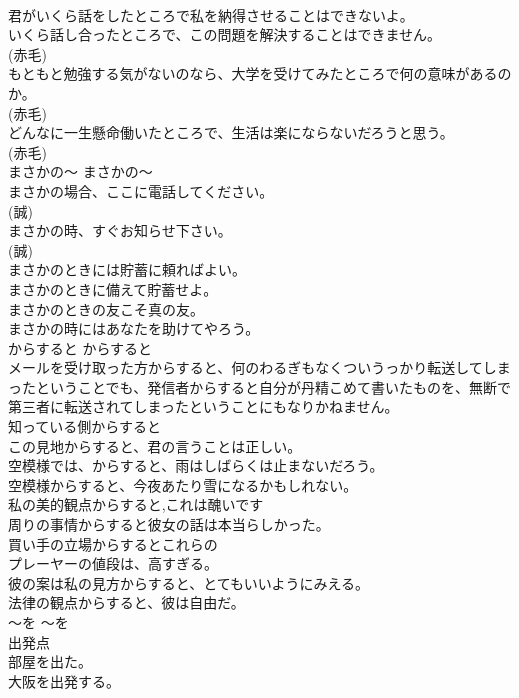 \documentclass[8pt]{extreport}
\begin{document}
\begin{CJK}{UTF8}{min}
\\	君がいくら話をしたところで私を納得させることはできないよ。  
\\	いくら話し合ったところで、この問題を解決することはできません。  
\\	(赤毛)
\\	もともと勉強する気がないのなら、大学を受けてみたところで何の意味があるのか。  
\\	(赤毛)
\\	どんなに一生懸命働いたところで、生活は楽にならないだろうと思う。  
\\	(赤毛)
\\	まさかの〜	まさかの〜	
\\	まさかの場合、ここに電話してください。  
\\	(誠)
\\	まさかの時、すぐお知らせ下さい。  
\\	(誠)
\\	まさかのときには貯蓄に頼ればよい。  
\\	まさかのときに備えて貯蓄せよ。  
\\	まさかのときの友こそ真の友。  
\\	まさかの時にはあなたを助けてやろう。  
\\	からすると	からすると	
\\	メールを受け取った方からすると、何のわるぎもなくついうっかり転送してしまったということでも、発信者からすると自分が丹精こめて書いたものを、無断で第三者に転送されてしまったということにもなりかねません。  
\\	知っている側からすると  
\\	この見地からすると、君の言うことは正しい。  
\\	空模様では、からすると、雨はしばらくは止まないだろう。  
\\	空模様からすると、今夜あたり雪になるかもしれない。  
\\	私の美的観点からすると,これは醜いです  
\\	周りの事情からすると彼女の話は本当らしかった。  
\\	買い手の立場からするとこれらの
\\	プレーヤーの値段は、高すぎる。  
\\	彼の案は私の見方からすると、とてもいいようにみえる。  
\\	法律の観点からすると、彼は自由だ。  
\\	〜を	〜を	
\\	出発点	
\\	部屋を出た。  
\\	大阪を出発する。  

\end{CJK}
\end{document}
